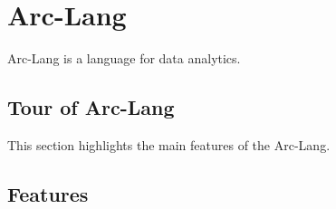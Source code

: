 \section{Arc-Lang}

Arc-Lang is a language for data analytics. 

\subsection{Tour of Arc-Lang}

This section highlights the main features of the Arc-Lang.

% 

\subsection{Features}


